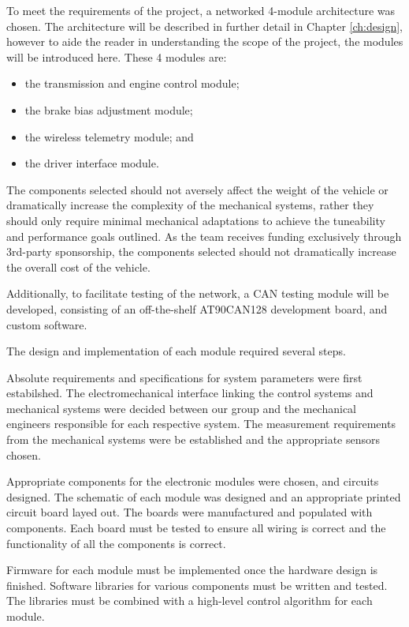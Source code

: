To meet the requirements of the project, a networked 4-module architecture was chosen. The architecture will be described in further detail in Chapter \ref{ch:design}, however to aide the reader in understanding the scope of the project, the modules will be introduced here. These 4 modules are:

\begin{itemize}
\item the transmission and engine control module;
\item the brake bias adjustment module;
\item the wireless telemetry module; and
\item the driver interface module.
\end{itemize}

The components selected should not aversely affect the weight of the vehicle or dramatically increase the complexity of the mechanical systems, rather they should only require minimal mechanical adaptations to achieve the tuneability and performance goals outlined. As the team receives funding exclusively through 3rd-party sponsorship, the components selected should not dramatically increase the overall cost of the vehicle.

Additionally, to facilitate testing of the network, a CAN testing module will be developed, consisting of an off-the-shelf AT90CAN128 development board, and custom software.

The design and implementation of each module required several steps. 

Absolute requirements and specifications for system parameters were first estabilshed. The electromechanical interface linking the control systems and mechanical systems were decided between our group and the mechanical engineers responsible for each respective system. The measurement requirements from the mechanical systems were be established and the appropriate sensors chosen.

Appropriate components for the electronic modules were chosen, and circuits designed. The schematic of each module was designed and an appropriate printed circuit board layed out. The boards were manufactured and populated with components. Each board must be tested to ensure all wiring is correct and the functionality of all the components is correct.

Firmware for each module must be implemented once the hardware design is finished. Software libraries for various components must be written and tested. The libraries must be combined with a high-level control algorithm for each module.
 
